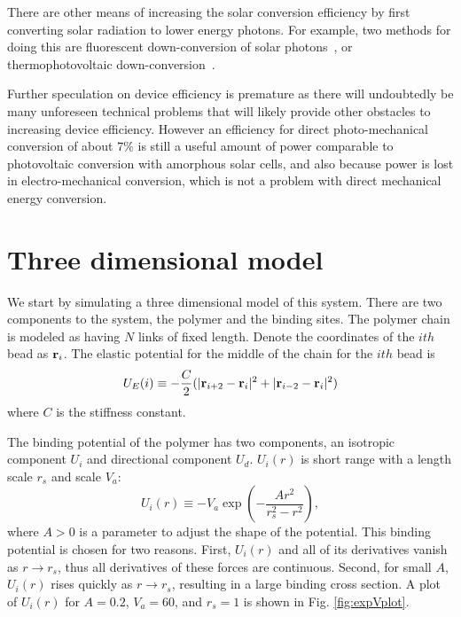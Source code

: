 \documentclass[journal = mamobx, manuscript = article]{achemso}
\def\br{{\bf r}}
\begin{document}
There are other means of increasing the solar conversion efficiency by first converting solar radiation to 
lower energy photons. For example, two methods for doing this are fluorescent down-conversion of solar
photons~\cite{Klampfatis}, or thermophotovoltaic down-conversion~\cite{Harder}.

Further speculation on device efficiency is premature as there will undoubtedly
be many unforeseen technical problems that will likely provide other obstacles
to increasing device efficiency. However an efficiency for direct
photo-mechanical conversion of about $7\%$ is still a useful amount of power
comparable to photovoltaic conversion with amorphous solar cells, and also because
power is lost in electro-mechanical conversion, which is not a problem with
direct mechanical energy conversion.

\section{Three dimensional model}
\label{sec:3Dmodel}

We start by simulating a three dimensional model of this system. There are two
components to the system, the polymer and the binding sites. The polymer chain
is modeled as having $N$ links of fixed length. Denote the coordinates of the $ith$ bead as $\br_i$. The elastic potential for the middle of the chain
for the $ith$ bead is
\begin{equation}
U_E(i) \equiv -\frac{C}{2}(|\br_{i+2}-\br_i|^2 + |\br_{i-2}-\br_i|^2)
\end{equation}
where $C$ is the stiffness constant.

The binding potential of the polymer has two components, an isotropic component
$U_i$ and directional component $U_d$. $U_i(r)$ is short range with a length
scale $r_s$ and scale $V_a$:
\begin{equation}
U_i(r) \equiv -V_a \exp\left(-\frac{A r^2}{r_s^2 - r^2}\right),
\label{eq:expU}
\end{equation}
where $A > 0$ is a parameter to adjust the shape of the potential. This binding potential is chosen for two reasons. First, $U_i(r)$ and all of its derivatives vanish as $r\rightarrow r_s$, thus all derivatives of these forces are continuous. Second, for small $A$, $U_i(r)$ rises quickly as $r\rightarrow r_s$, resulting in a large binding cross section. A plot of $U_i(r)$ for $A = 0.2$, $V_a = 60$, and $r_s = 1$ is shown in Fig. \ref{fig:expVplot}.
\end{document}
